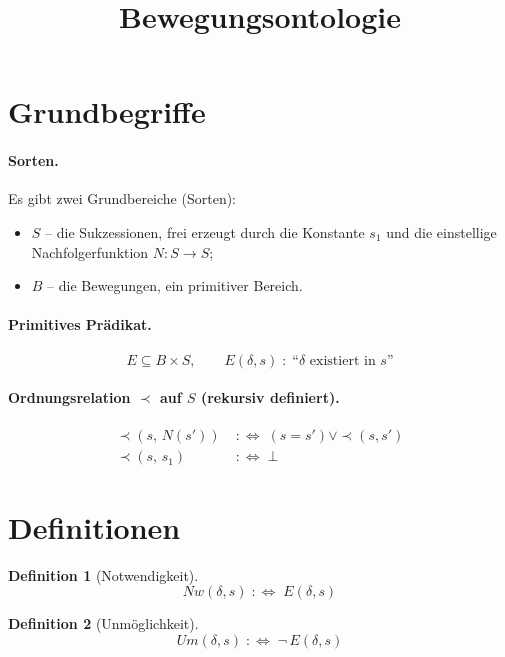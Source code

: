\documentclass[11pt]{article}
\title{Bewegungsontologie}
\author{}
\date{}
\newtheorem{definition}{Definition}
\begin{document}
\maketitle

\section*{Grundbegriffe}

\paragraph{Sorten.}
Es gibt zwei Grundbereiche (Sorten):
\begin{itemize}
  \item $S$ -- die Sukzessionen, frei erzeugt durch die Konstante $s_1$ und die einstellige Nachfolgerfunktion $N : S \to S$;
  \item $B$ -- die Bewegungen, ein primitiver Bereich.
\end{itemize}

\paragraph{Primitives Prädikat.}
$$E \subseteq B \times S, \qquad E(\delta,s) \;:\; \text{``}\delta\text{ existiert in } s\text{''}$$

\paragraph{Ordnungsrelation $\prec$ auf $S$ (rekursiv definiert).}
\begin{align}
\prec(s,\, N(s')) &\;:\Longleftrightarrow\; (s = s') \vee \prec(s,s') \\
\prec(s,\, s_1)    &\;:\Longleftrightarrow\; \bot
\end{align}

\section*{Definitionen}

\begin{definition}[Notwendigkeit]
$$Nw(\delta,s) \;:\Longleftrightarrow\; E(\delta,s)$$
\end{definition}

\begin{definition}[Unmöglichkeit]
$$Um(\delta,s) \;:\Longleftrightarrow\; \neg\, E(\delta,s)$$
\end{definition}
\end{document}
